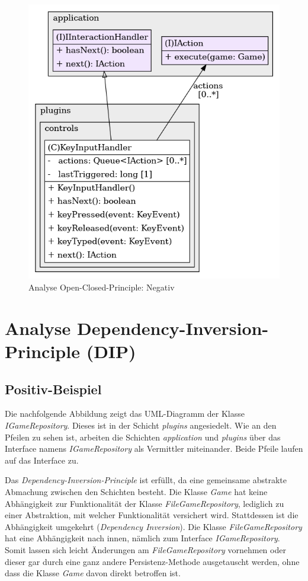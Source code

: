 \vspace{0.5cm}
\begin{figure}[H]
    \centering
    \includegraphics[width=0.5\linewidth]{Bilder/Visualisierung/KeyInputHandlerOCPViolation_structure.png}
    \caption{Analyse Open-Closed-Principle: Negativ}
\end{figure}

\section{Analyse Dependency-Inversion-Principle (DIP)}
\subsection{Positiv-Beispiel}
Die nachfolgende Abbildung zeigt das UML-Diagramm der Klasse
\textit{IGameRepository}. Dieses ist in der Schicht \textit{plugins}
angesiedelt. Wie an den Pfeilen zu sehen ist, arbeiten die Schichten
\textit{application} und \textit{plugins} über das Interface
namens \textit{IGameRepository} als Vermittler miteinander. Beide
Pfeile laufen auf das Interface zu. 

Das \textit{Dependency-Inversion-Principle} ist erfüllt, da eine
gemeinsame abstrakte Abmachung zwischen den Schichten besteht. Die
Klasse \textit{Game} hat keine Abhängigkeit zur Funktionalität der
Klasse \textit{FileGameRepository}, lediglich zu einer Abstraktion,
mit welcher Funktionalität versichert wird. Stattdessen ist die
Abhängigkeit umgekehrt (\textit{Dependency Inversion}). Die Klasse
\textit{FileGameRepository} hat eine Abhängigkeit nach innen, nämlich
zum Interface \textit{IGameRepository}. Somit lassen sich leicht
Änderungen am \textit{FileGameRepository} vornehmen oder dieser gar
durch eine ganz andere Persistenz-Methode ausgetauscht werden, ohne
dass die Klasse \textit{Game} davon direkt betroffen ist.

